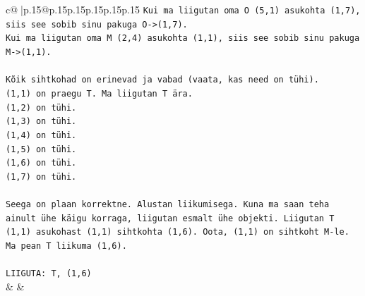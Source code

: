 \documentclass{article}
\begin{document}
{\begin{supertabular}{c@{$\;$}|p{.15\linewidth}@{}p{.15\linewidth}p{.15\linewidth}p{.15\linewidth}p{.15\linewidth}p{.15\linewidth}}
{{{\texttt{Kui ma liigutan oma O (5,1) asukohta (1,7), siis see sobib sinu pakuga O{-}>(1,7).} \\
\texttt{Kui ma liigutan oma M (2,4) asukohta (1,1), siis see sobib sinu pakuga M{-}>(1,1).} \\
\\ 
\texttt{Kõik sihtkohad on erinevad ja vabad (vaata, kas need on tühi).} \\
\texttt{(1,1) on praegu T. Ma liigutan T ära.} \\
\texttt{(1,2) on tühi.} \\
\texttt{(1,3) on tühi.} \\
\texttt{(1,4) on tühi.} \\
\texttt{(1,5) on tühi.} \\
\texttt{(1,6) on tühi.} \\
\texttt{(1,7) on tühi.} \\
\\ 
\texttt{Seega on plaan korrektne. Alustan liikumisega. Kuna ma saan teha ainult ühe käigu korraga, liigutan esmalt ühe objekti. Liigutan T (1,1) asukohast (1,1) sihtkohta (1,6). Oota, (1,1) on sihtkoht M{-}le. Ma pean T liikuma (1,6).} \\
\\ 
\texttt{LIIGUTA: T, (1,6)} \\
            }
        }
    }
    & & \\ \\


\end{supertabular}}
\end{document}
